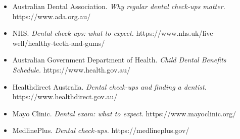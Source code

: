 \begin{itemize}
    \item Australian Dental Association. \textit{Why regular dental check-ups matter.} https://www.ada.org.au/
    \item NHS. \textit{Dental check-ups: what to expect.} https://www.nhs.uk/live-well/healthy-teeth-and-gums/
    \item Australian Government Department of Health. \textit{Child Dental Benefits Schedule.} https://www.health.gov.au/
    \item Healthdirect Australia. \textit{Dental check-ups and finding a dentist.} https://www.healthdirect.gov.au/
    \item Mayo Clinic. \textit{Dental exam: what to expect.} https://www.mayoclinic.org/
    \item MedlinePlus. \textit{Dental check-ups.} https://medlineplus.gov/
\end{itemize}
